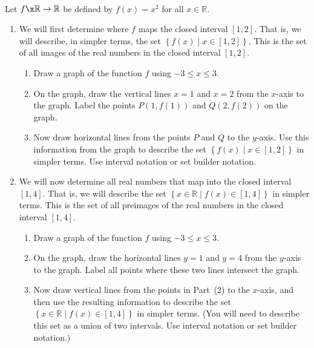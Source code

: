 \begin{previewactivity} \label{PA:functionsandint} \hfill \\
Let $f\x \mathbb{R} \to \mathbb{R}$ be defined by $f ( x ) = x^2$ for all 
$x \in \mathbb{R}$.

\begin{enumerate}
\item We will first determine where $f$ maps the closed interval $\left[ 1, 2 \right]$.  That is, we will describe, in simpler terms, the set 
$\left\{ f ( x ) \mid x \in \left[ 1, 2 \right] \right\}$.  This is the set of all images of the real numbers in the closed interval $\left[ 1, 2 \right]$.

\begin{enumerate}
\item Draw a graph of the function $f$ using $-3 \leq x \leq 3$.

\item On the graph, draw the vertical lines $x = 1$ and $x = 2$ from the $x$-axis to the graph.   Label the points $P \!\left(1, f ( 1 ) \right)$ and 
$Q \!\left(2, f ( 2 ) \right)$ on the graph.

\item Now draw horizontal lines from the points $P$ and $Q$ to the $y$-axis.  Use this information from the graph to describe the set 
$\left\{ f ( x ) \mid x \in \left[ 1, 2 \right] \right\}$ in simpler terms.  Use interval notation or set builder notation.
\end{enumerate}

\item We will now determine all real numbers that map into the closed interval 
$\left[ 1, 4 \right]$.  That is, we will describe the set 
$\left\{ x \in \mathbb{R} \mid f ( x ) \in \left[ 1, 4 \right] \right\}$ in simpler terms.  This is the set of all preimages of the real numbers in the closed interval $\left[ 1, 4 \right]$.

\begin{enumerate}
\item Draw a graph of the function $f$ using $-3 \leq x \leq 3$.

\item On the graph, draw the horizontal lines $y = 1$ and $y = 4$ from the $y$-axis to the graph.   Label all points where these two lines intersect the graph.

\item Now draw vertical lines from the points in Part~(2) to the $x$-axis, and then use the resulting information  to describe the set \linebreak
$\left\{ x \in \mathbb{R} \mid f ( x ) \in \left[ 1, 4 \right] \right\}$ in simpler terms.  (You will need to describe this set as a union of two intervals.  Use interval notation or set builder notation.)
\end{enumerate}
\end{enumerate}
\end{previewactivity}
\hbreak

\endinput

